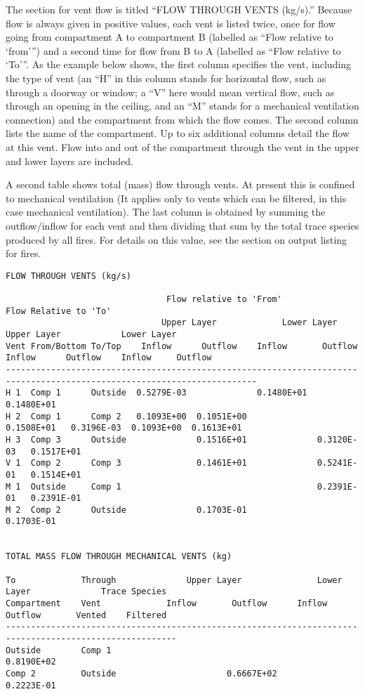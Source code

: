 The section for vent flow is titled ``FLOW THROUGH VENTS (kg/s).''  Because flow is always given in positive values, each vent is listed twice, once for flow going from compartment A to compartment B (labelled as ``Flow relative to `from''') and a second time for flow from B to A (labelled as ``Flow relative to `To'''.  As the example below shows, the first column specifies the vent, including the type of vent (an ``H'' in this column stands for horizontal flow, such as through a doorway or window; a ``V'' here would mean vertical flow, such as through an opening in the ceiling, and an ``M'' stands for a mechanical ventilation connection) and the compartment from which the flow comes. The second column lists the name of the compartment. Up to six additional columns detail the flow at this vent. Flow into and out of the compartment through the vent in the upper and lower layers are included.

A second table shows total (mass) flow through vents. At present this is confined to mechanical ventilation (It applies only to vents which can be filtered, in this case mechanical ventilation). The last column is obtained by summing the outflow/inflow for each vent and then dividing that sum by the total trace species produced by all fires. For details on this value, see the section on output listing for fires.

\begin{lstlisting}[basicstyle=\tiny]
FLOW THROUGH VENTS (kg/s)

                                Flow relative to 'From'                             Flow Relative to 'To'
                               Upper Layer             Lower Layer              Upper Layer            Lower Layer
Vent From/Bottom To/Top    Inflow      Outflow    Inflow       Outflow      Inflow      Outflow    Inflow     Outflow
------------------------------------------------------------------------------------------------------------------------
H 1  Comp 1      Outside  0.5279E-03              0.1480E+01                                                  0.1480E+01
H 2  Comp 1      Comp 2   0.1093E+00  0.1051E+00              0.1508E+01   0.3196E-03  0.1093E+00  0.1613E+01  
H 3  Comp 3      Outside              0.1516E+01              0.3120E-03   0.1517E+01
V 1  Comp 2      Comp 3               0.1461E+01              0.5241E-01   0.1514E+01
M 1  Outside     Comp 1                                       0.2391E-01   0.2391E-01
M 2  Comp 2      Outside              0.1703E-01                                                   0.1703E-01


TOTAL MASS FLOW THROUGH MECHANICAL VENTS (kg)

To             Through              Upper Layer               Lower Layer              Trace Species
Compartment    Vent             Inflow       Outflow      Inflow       Outflow       Vented    Filtered
--------------------------------------------------------------------------------------------------------
Outside        Comp 1                                                 0.8190E+02
Comp 2         Outside                      0.6667E+02                0.2223E-01

\end{lstlisting}


